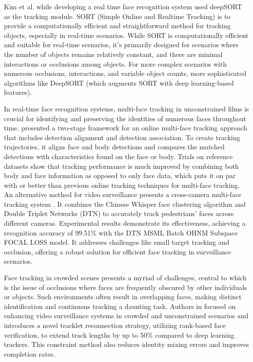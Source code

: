 Kim et al. \cite{kim_facial_2023} while developing a real time face recognition system used deepSORT as the tracking module. SORT (Simple Online and Realtime Tracking) is to provide a computationally efficient and straightforward method for tracking objects, especially in real-time scenarios. While SORT is computationally efficient and suitable for real-time scenarios, it's primarily designed for scenarios where the number of objects remains relatively constant, and there are minimal interactions or occlusions among objects. For more complex scenarios with numerous occlusions, interactions, and variable object counts, more sophisticated algorithms like DeepSORT (which augments SORT with deep learning-based features).

In real-time face recognition systems, multi-face tracking in unconstrained films is crucial for identifying and preserving the identities of numerous faces throughout time. \cite{weng_online_2023} presented a two-stage framework for an online multi-face tracking approach that includes detection alignment and detection association. To create tracking trajectories, it aligns face and body detections and compares the matched detections with characteristics found on the face or body. Trials on reference datasets show that tracking performance is much improved by combining both body and face information as opposed to only face data, which puts it on par with or better than previous online tracking techniques for multi-face tracking. An alternative method for video surveillance presents a cross-camera multi-face tracking system \cite{ren_cross-camera_2021}. It combines the Chinese Whisper face clustering algorithm and Double Triplet Networks (DTN) to accurately track pedestrians' faces across different cameras. Experimental results demonstrate its effectiveness, achieving a recognition accuracy of 99.51\% with the DTN MSML Batch OHNM Subspace FOCAL LOSS model. It addresses challenges like small target tracking and occlusion, offering a robust solution for efficient face tracking in surveillance scenarios.

Face tracking in crowded scenes presents a myriad of challenges, central to which is the issue of occlusions where faces are frequently obscured by other individuals or objects. Such environments often result in overlapping faces, making distinct identification and continuous tracking a daunting task. Authors in \cite{barquero_rank-based_2021} focused on enhancing video surveillance systems in crowded and unconstrained scenarios and introduces a novel tracklet reconnection strategy, utilizing rank-based face verification, to extend track lengths by up to 50\% compared to deep learning trackers. This constraint method also reduces identity mixing errors and improves completion rates.

